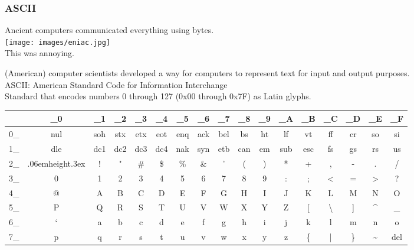 \documentclass[smaller,xcolor=table,aspectratio=169]{beamer}
\newcommand\Vtextvisiblespace[1][.3em]{%
  \mbox{\kern.06em\vrule height.3ex}%
  \vbox{\hrule width#1}%
  \hbox{\vrule height.3ex}}
\begin{document}
\begin{frame}
  \frametitle{ASCII}
  Ancient computers communicated everything using bytes.\\
  \texttt{[image: images/eniac.jpg]}\pause{}\\
  This was annoying.
\end{frame}

\newcommand{\CNT}{\cellcolor{mathematica green!25}}
\newcommand{\ALP}{\cellcolor{mathematica orange!25}}
\newcommand{\PUN}{\cellcolor{mathematica purple!25}}
\begin{frame}[plain]
  (American) computer scientists developed a way for computers to represent text for input and output purposes.\\
  ASCII: American Standard Code for Information Interchange\\
  Standard that encodes numbers 0 through 127 (0x00 through 0x7F) as Latin glyphs.\\
  \begin{table}
    \tiny\ttfamily
    \begin{tabular}{r|c|c|c|c|c|c|c|c|c|c|c|c|c|c|c|c}
      & \_0 & \_1 & \_2 & \_3 & \_4 & \_5 & \_6 & \_7 & \_8 & \_9 & \_A & \_B & \_C & \_D & \_E & \_F \\ \hline
      0\_ & \CNT nul & \CNT soh & \CNT stx & \CNT etx & \CNT eot & \CNT enq & \CNT ack & \CNT bel & \CNT bs & \CNT ht & \CNT lf & \CNT vt & \CNT ff & \CNT cr & \CNT so & \CNT si \\
      1\_ & \CNT dle & \CNT dc1 & \CNT dc2 & \CNT dc3 & \CNT dc4 & \CNT nak & \CNT syn & \CNT etb & \CNT can & \CNT em & \CNT sub & \CNT esc & \CNT fs & \CNT gs & \CNT rs & \CNT us \\
      2\_ & \PUN \Vtextvisiblespace & \PUN ! & \PUN " & \PUN \# & \PUN \$ & \PUN \% & \PUN \& & \PUN ' & \PUN ( & \PUN ) & \PUN * & \PUN + & \PUN , & \PUN - & \PUN . & \PUN / \\
      3\_ & \ALP 0 & \ALP 1 & \ALP 2 & \ALP 3 & \ALP 4 & \ALP 5 & \ALP 6 & \ALP 7 & \ALP 8 & \ALP 9 & \PUN : & \PUN ; & \PUN < & \PUN = & \PUN > & \PUN ? \\
      4\_ & \PUN @ & \ALP A & \ALP B & \ALP C & \ALP D & \ALP E & \ALP F & \ALP G & \ALP H & \ALP I & \ALP J & \ALP K & \ALP L & \ALP M & \ALP N & \ALP O \\
      5\_ & \ALP P & \ALP Q & \ALP R & \ALP S & \ALP T & \ALP U & \ALP V & \ALP W & \ALP X & \ALP Y & \ALP Z & \PUN [ & \PUN \textbackslash & \PUN ] & \PUN \textasciicircum & \PUN \_ \\
      6\_ & \PUN ` & \ALP a & \ALP b & \ALP c & \ALP d & \ALP e & \ALP f & \ALP g & \ALP h & \ALP i & \ALP j & \ALP k & \ALP l & \ALP m & \ALP n & \ALP o \\
      7\_ & \ALP p & \ALP q & \ALP r & \ALP s & \ALP t & \ALP u & \ALP v & \ALP w & \ALP x & \ALP y & \ALP z & \PUN \{ & \PUN | & \PUN \} & \PUN \textasciitilde & \CNT del \\
    \end{tabular}
  \end{table}
\end{frame}
\end{document}
